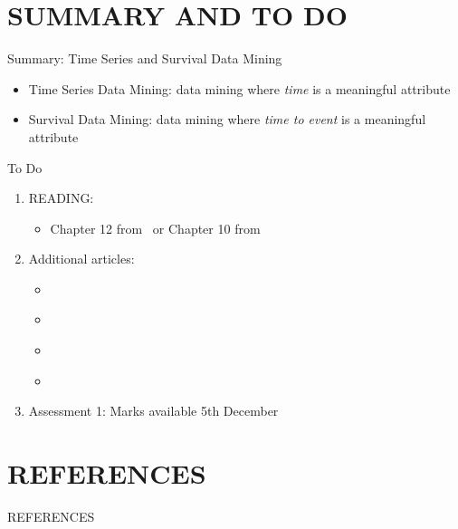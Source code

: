 \documentclass[handout]{beamer}
\begin{document}
\section*{SUMMARY AND TO DO}
\begin{frame}{Summary: Time Series and Survival Data Mining}
\begin{itemize}
\item Time Series Data Mining: data mining where \emph{time} is a meaningful attribute 
\item Survival Data Mining: data mining where \emph{time to event} is a meaningful attribute
\end{itemize}
\end{frame}
\begin{frame}{To Do}
\begin{enumerate}
\item READING:
	\begin{itemize}
	\item Chapter 12 from~\cite{LB2:2004} or Chapter 10 from~\cite{LB3:2011}
	\end{itemize}
\item Additional articles:
	\begin{itemize}
	\item \cite{chatfield:1975}
	\item \cite{fu:2011}
	\item \cite{kalbfleisch-prentice:1980}
	\item \cite{bou-hamad-et-al:2011}
	\end{itemize}
\item Assessment 1: Marks available 5th December

\end{enumerate}
\end{frame}



\section*{REFERENCES}
\begin{frame}[allowframebreaks]{REFERENCES}


\end{frame}
\end{document}
